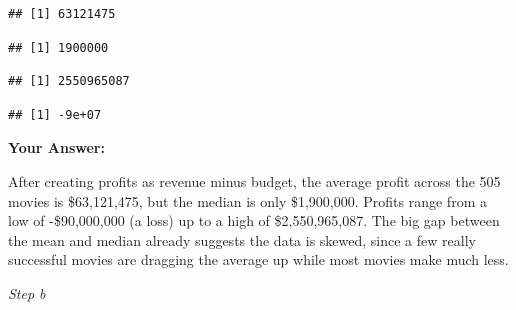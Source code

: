 \documentclass[
]{article}
\newenvironment{Shaded}{\begin{snugshade}}{\end{snugshade}}
\newcommand{\FunctionTok}[1]{\textcolor[rgb]{0.13,0.29,0.53}{\textbf{#1}}}
\newcommand{\NormalTok}[1]{#1}
\newcommand{\OtherTok}[1]{\textcolor[rgb]{0.56,0.35,0.01}{#1}}
\newcommand{\SpecialCharTok}[1]{\textcolor[rgb]{0.81,0.36,0.00}{\textbf{#1}}}
\newcommand{\StringTok}[1]{\textcolor[rgb]{0.31,0.60,0.02}{#1}}
\begin{document}
\begin{verbatim}
## [1] 63121475
\end{verbatim}

\begin{Shaded}
\end{Shaded}

\begin{verbatim}
## [1] 1900000
\end{verbatim}

\begin{Shaded}
\end{Shaded}

\begin{verbatim}
## [1] 2550965087
\end{verbatim}

\begin{Shaded}
\end{Shaded}

\begin{verbatim}
## [1] -9e+07
\end{verbatim}

\textbf{Your Answer:}

After creating profits as revenue minus budget, the average profit
across the 505 movies is \$63,121,475, but the median is only
\$1,900,000. Profits range from a low of -\$90,000,000 (a loss) up to a
high of \$2,550,965,087. The big gap between the mean and median already
suggests the data is skewed, since a few really successful movies are
dragging the average up while most movies make much less.

\emph{Step b}

\begin{Shaded}
\end{Shaded}
\end{document}

